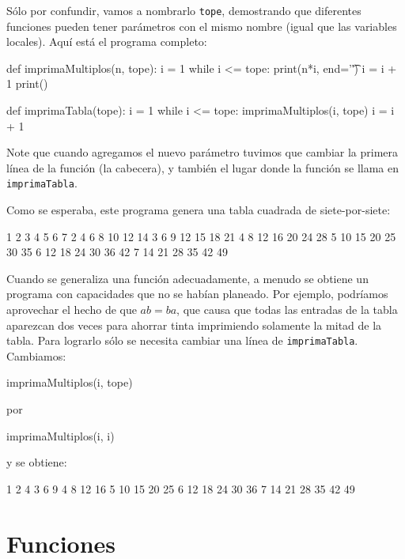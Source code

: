 Sólo por confundir, vamos a nombrarlo \texttt{tope}, demostrando que
diferentes funciones pueden tener parámetros con el mismo nombre (igual
que las variables locales). Aquí está el programa completo:
\begin{pythoncode}
def imprimaMultiplos(n, tope):
  i = 1
  while i <= tope:
    print(n*i, end='\t')
    i = i + 1
  print()

def imprimaTabla(tope):
  i = 1
  while i <= tope:
    imprimaMultiplos(i, tope)
    i = i + 1
\end{pythoncode}

Note que cuando agregamos el nuevo parámetro tuvimos que cambiar la
primera línea de la función (la cabecera), y también el lugar donde
la función se llama en \texttt{imprimaTabla}.

Como se esperaba, este programa genera una tabla cuadrada de siete-por-siete:
\begin{pythoncode}
1      2      3      4      5      6      7
2      4      6      8      10     12     14
3      6      9      12     15     18     21
4      8      12     16     20     24     28
5      10     15     20     25     30     35
6      12     18     24     30     36     42
7      14     21     28     35     42     49
\end{pythoncode}
Cuando se generaliza una función adecuadamente, a menudo se obtiene
un programa con capacidades que no se habían planeado. Por ejemplo,
podríamos aprovechar el hecho de que $ab=ba$, que causa que todas
las entradas de la tabla aparezcan dos veces para ahorrar tinta imprimiendo
solamente la mitad de la tabla. Para lograrlo sólo se necesita cambiar
una línea de \texttt{imprimaTabla}. Cambiamos:
\begin{pythoncode}
    imprimaMultiplos(i, tope)
\end{pythoncode}
por
\begin{pythoncode}
    imprimaMultiplos(i, i)
\end{pythoncode}
y se obtiene:
\begin{pythoncode}
1
2      4
3      6      9
4      8      12     16
5      10     15     20     25
6      12     18     24     30     36
7      14     21     28     35     42     49
\end{pythoncode}

\section{Funciones}


